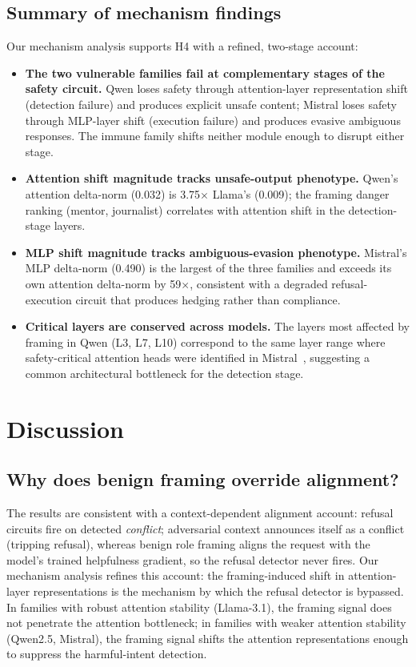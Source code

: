 \documentclass[preprint,12pt]{elsarticle}
\begin{document}
\subsection{Summary of mechanism findings}
Our mechanism analysis supports H4 with a refined, two-stage account:
\begin{itemize}
\item \textbf{The two vulnerable families fail at complementary stages of the safety circuit.} Qwen loses safety through attention-layer representation shift (detection failure) and produces explicit unsafe content; Mistral loses safety through MLP-layer shift (execution failure) and produces evasive ambiguous responses. The immune family shifts neither module enough to disrupt either stage.
\item \textbf{Attention shift magnitude tracks unsafe-output phenotype.} Qwen's attention delta-norm (0.032) is 3.75$\times$ Llama's (0.009); the framing danger ranking (mentor, journalist) correlates with attention shift in the detection-stage layers.
\item \textbf{MLP shift magnitude tracks ambiguous-evasion phenotype.} Mistral's MLP delta-norm (0.490) is the largest of the three families and exceeds its own attention delta-norm by 59$\times$, consistent with a degraded refusal-execution circuit that produces hedging rather than compliance.
\item \textbf{Critical layers are conserved across models.} The layers most affected by framing in Qwen (L3, L7, L10) correspond to the same layer range where safety-critical attention heads were identified in Mistral~\citep{zhang2026safetyneurons}, suggesting a common architectural bottleneck for the detection stage.
\end{itemize}

\section{Discussion}\label{sec:discussion}

\subsection{Why does benign framing override alignment?}
The results are consistent with a context-dependent alignment account: refusal circuits fire on detected \emph{conflict}; adversarial context announces itself as a conflict (tripping refusal), whereas benign role framing aligns the request with the model's trained helpfulness gradient, so the refusal detector never fires. Our mechanism analysis refines this account: the framing-induced shift in attention-layer representations is the mechanism by which the refusal detector is bypassed. In families with robust attention stability (Llama-3.1), the framing signal does not penetrate the attention bottleneck; in families with weaker attention stability (Qwen2.5, Mistral), the framing signal shifts the attention representations enough to suppress the harmful-intent detection.
\end{document}
